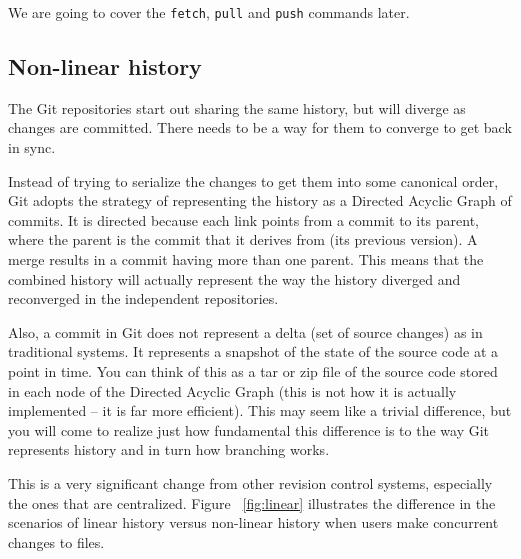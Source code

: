 We are going to cover the \texttt{fetch}, \texttt{pull} and
\texttt{push} commands later. 

\subsection{Non-linear history}

The Git repositories start out sharing the same history, but will
diverge as changes are committed.  There needs to be a way for them
to converge to get back in sync.

Instead of trying to serialize the changes to get them into some
canonical order, Git adopts the strategy of representing the
history as a Directed Acyclic Graph of commits.  It is directed
because each link points from a commit to its parent, where the
parent is the commit that it derives from (its previous version).
A merge results in a commit having more than one parent.  This
means that the combined history will actually represent the way the
history diverged and reconverged in the independent repositories.

Also, a commit in Git does not represent a delta (set of source
changes) as in traditional systems.  It represents a snapshot of
the state of the source code at a point in time.  You can think of
this as a tar or zip file of the source code stored in each node of
the Directed Acyclic Graph (this is not how it is actually
implemented -- it is far more efficient).  This may seem like a
trivial difference, but you will come to realize just how
fundamental this difference is to the way Git represents history
and in turn how branching works.

This is a very significant change from other revision control systems,
especially the ones that are centralized. Figure ~\ref{fig:linear}
illustrates the difference in the scenarios of linear history versus
non-linear history when users make concurrent changes to
files.


